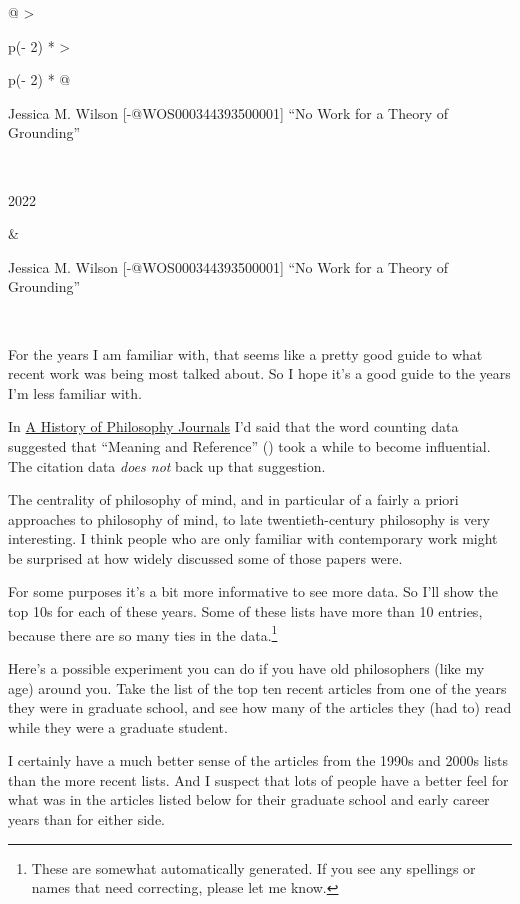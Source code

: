 \documentclass[
  10pt,
  letterpaper,
  DIV=11,
  numbers=noendperiod,
  twoside]{scrartcl}
\begin{document}
\begin{longtable}[]{@{}
  >{\raggedright\arraybackslash}p{(\columnwidth - 2\tabcolsep) * }
  >{\raggedright\arraybackslash}p{(\columnwidth - 2\tabcolsep) * }@{}}
\begin{minipage}[t]{\linewidth}
Jessica M. Wilson {[}-@WOS000344393500001{]} ``No Work for a Theory of
Grounding''
\end{minipage} \\
\begin{minipage}[t]{\linewidth}\raggedright
2022
\end{minipage} & \begin{minipage}[t]{\linewidth}\raggedright
Jessica M. Wilson {[}-@WOS000344393500001{]} ``No Work for a Theory of
Grounding''
\end{minipage} \\

\end{longtable}

For the years I am familiar with, that seems like a pretty good guide to
what recent work was being most talked about. So I hope it's a good
guide to the years I'm less familiar with.

In \href{https://websites.umich.edu/~weath/lda/topic85.html}{A History
of Philosophy Journals} I'd said that the word counting data suggested
that ``Meaning and Reference'' () took a while to become influential. The citation data \emph{does
not} back up that suggestion.

The centrality of philosophy of mind, and in particular of a fairly a
priori approaches to philosophy of mind, to late twentieth-century
philosophy is very interesting. I think people who are only familiar
with contemporary work might be surprised at how widely discussed some
of those papers were.

For some purposes it's a bit more informative to see more data. So I'll
show the top 10s for each of these years. Some of these lists have more
than 10 entries, because there are so many ties in the data.\footnote{These
  are somewhat automatically generated. If you see any spellings or
  names that need correcting, please let me know.}

Here's a possible experiment you can do if you have old philosophers
(like my age) around you. Take the list of the top ten recent articles
from one of the years they were in graduate school, and see how many of
the articles they (had to) read while they were a graduate student.

I certainly have a much better sense of the articles from the 1990s and
2000s lists than the more recent lists. And I suspect that lots of
people have a better feel for what was in the articles listed below for
their graduate school and early career years than for either side.
\end{document}
